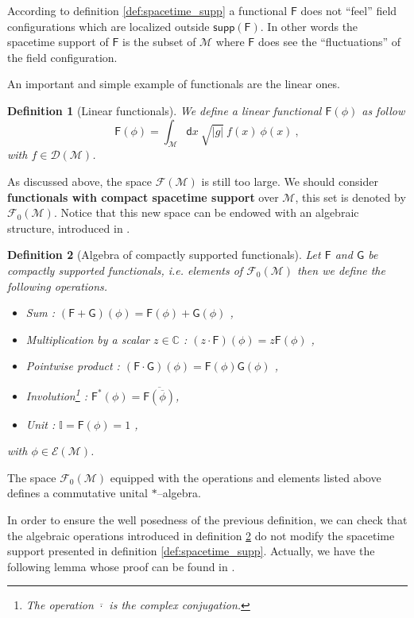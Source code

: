 \documentclass[11pt]{book}
\newcommand{\supp}{\mathsf{supp}}
\newcommand{\abs}[1]{\left|#1\right|}
\newcommand{\Dcal}{\mathcal{D}}
\newcommand{\Ecal}{\mathcal{E}}
\newcommand{\Fcal}{\mathcal{F}}
\newcommand{\Mcal}{\mathcal{M}}
\newcommand{\Cbb}{\mathbb{C}}
\newcommand{\Ibb}{\mathbb{I}}
\newcommand{\Fsf}{\mathsf{F}}
\newcommand{\Gsf}{\mathsf{G}}
\newcommand{\dsf}{\mathsf{d}}
\theoremstyle{break}
\newtheorem{definition}{Definition}[chapter]
\begin{document}
According to definition \ref{def:spacetime_supp} a functional $\Fsf$ does not ``feel'' field configurations which are localized outside $\supp(\Fsf)$. In other words the spacetime support of $\Fsf$ is the subset of $\Mcal$ where $\Fsf$ does see the ``fluctuations'' of the field configuration.


An important and simple example of functionals are the linear ones. 


\begin{definition}[Linear functionals]\label{def:linear_obs}
We define a linear functional $\Fsf(\phi)$ as follow
%
\begin{equation*}
\Fsf(\phi) = \int_\Mcal \dsf x \ \sqrt{\abs{g}} \ f(x) \ \phi(x) \ , 
\end{equation*}
%
with $f \in \Dcal(\Mcal)$.
\end{definition}



As discussed above, the space $\Fcal(\Mcal)$ is still too large. We should consider \textbf{functionals with compact spacetime support} over $\Mcal$, this set is denoted by $\Fcal_0(\Mcal)$. Notice that this new space can be endowed with an algebraic structure, introduced in \cite{brunetti_algebraic_2012}.


\begin{definition}[Algebra of compactly supported functionals] \label{def:algebra_comp_supp_func}
Let $\Fsf$ and $\Gsf$ be compactly supported functionals, i.e. elements of $\Fcal_0(\Mcal)$ then we define the following operations.
%
\begin{itemize}
\item Sum : $(\Fsf+\Gsf)(\phi) = \Fsf(\phi) + \Gsf(\phi)$ ,
\item Multiplication by a scalar $z\in\Cbb$ : $(z \cdot \Fsf)(\phi) = z \Fsf(\phi)$ ,
\item Pointwise product : $(\Fsf \cdot \Gsf)(\phi) = \Fsf(\phi) \Gsf(\phi)$ ,
\item Involution\footnote{The operation $\overline{\cdot}$ is the complex conjugation.} : $\Fsf^\ast(\phi) = \overline{\Fsf(\overline{\phi})}$,
\item Unit : $\Ibb = \Fsf(\phi) = 1$ ,
\end{itemize}
%
with $\phi \in \Ecal(\Mcal)$. 
\end{definition}


The space $\Fcal_0(\Mcal)$ equipped with the operations and elements listed above defines a commutative unital $\ast$--algebra.


In order to ensure the well posedness of the previous definition, we can check that the algebraic operations introduced in definition \ref{def:algebra_comp_supp_func} do not modify the spacetime support presented in definition \ref{def:spacetime_supp}. Actually, we have the following lemma whose proof can be found in  \cite{brunetti_algebraic_2012}.
\end{document}
